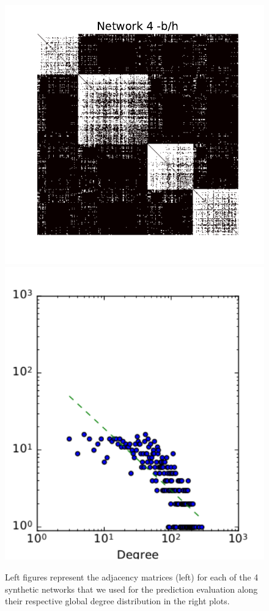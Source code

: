 \begin{figure}[h]
	\endminipage
	\vspace{-0.4cm}
	\includegraphics[scale=0.4]{img/g4}
	\endminipage
	\includegraphics[scale=0.4]{img/g4_d}
	\endminipage
	
	\caption{Left figures represent the adjacency matrices (left) for each of the 4 synthetic networks that we used for the prediction evaluation along their respective global degree distribution in the right plots.}
	\label{fig:synt_graph}
\end{figure}

